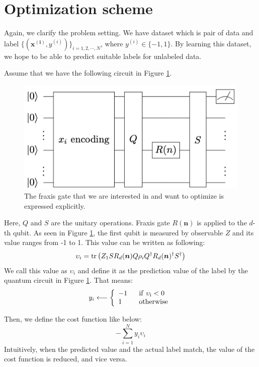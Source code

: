\section{Optimization scheme}
\par Again, we clarify the problem setting. We have dataset which is pair of data and label  $\{(\bm{x^{(i)}}, y^{(i)})\}_{i=1,2,\cdots,N}$, where  $y^{(i)}\in\{-1,1\}$. By learning this dataset, we hope to be able to predict suitable labels for unlabeled data. 

\par Assume that we have the following circuit in Figure \ref{fig:abst1}.
\begin{figure}[htb]
    \centering
    \includegraphics[keepaspectratio, scale=1.5]{method/abst1.png}
    \caption{The fraxis gate that we are interested in and want to optimize is expressed explicitly.}
    \label{fig:abst1}
\end{figure}
Here, $Q$ and $S$ are the unitary operations. Fraxis gate $R(\bm{n})$ is applied to the $d$-th qubit. As seen in Figure \ref{fig:abst1}, the first qubit is measured by observable $Z$ and its value ranges from -1 to 1. This value can be written as following:
$$\upsilon_i=\operatorname{tr}{\left(Z_1 SR_d(\bm{n})Q\rho_{i} Q^\dagger R_d(\bm{n})^{\dagger}S^\dagger\right)}$$
We call this value as $\upsilon_i$ and define it as the prediction value of the label by the quantum circuit in Figure \ref{fig:abst1}. That means:
$$y_i \longleftarrow
\left\{
\begin{array}{ll}
-1 & \ \ \rm{if}\ \upsilon_i<0\\
1 & \ \ \rm{otherwise}\\
\end{array}
\right.
$$

\par Then, we define the cost function like below:
$$-\sum_{i=1}^N y_{i}\upsilon_i$$
Intuitively, when the predicted value and the actual label match, the value of the cost function is reduced, and vice versa.

